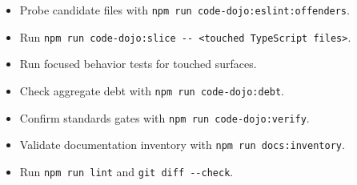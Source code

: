 \begin{itemize}
\tightlist
\item
  Probe candidate files with \texttt{n\allowbreak{}p\allowbreak{}m\allowbreak{} \allowbreak{}r\allowbreak{}u\allowbreak{}n\allowbreak{} \allowbreak{}c\allowbreak{}o\allowbreak{}d\allowbreak{}e\allowbreak{}-\allowbreak{}d\allowbreak{}o\allowbreak{}j\allowbreak{}o\allowbreak{}:\allowbreak{}e\allowbreak{}s\allowbreak{}l\allowbreak{}i\allowbreak{}n\allowbreak{}t\allowbreak{}:\allowbreak{}o\allowbreak{}f\allowbreak{}f\allowbreak{}e\allowbreak{}n\allowbreak{}d\allowbreak{}e\allowbreak{}r\allowbreak{}s}.
\item
  Run \texttt{n\allowbreak{}p\allowbreak{}m\allowbreak{} \allowbreak{}r\allowbreak{}u\allowbreak{}n\allowbreak{} \allowbreak{}c\allowbreak{}o\allowbreak{}d\allowbreak{}e\allowbreak{}-\allowbreak{}d\allowbreak{}o\allowbreak{}j\allowbreak{}o\allowbreak{}:\allowbreak{}s\allowbreak{}l\allowbreak{}i\allowbreak{}c\allowbreak{}e\allowbreak{} \allowbreak{}-\allowbreak{}-\allowbreak{} \allowbreak{}<\allowbreak{}t\allowbreak{}o\allowbreak{}u\allowbreak{}c\allowbreak{}h\allowbreak{}e\allowbreak{}d\allowbreak{} \allowbreak{}T\allowbreak{}y\allowbreak{}p\allowbreak{}e\allowbreak{}S\allowbreak{}c\allowbreak{}r\allowbreak{}i\allowbreak{}p\allowbreak{}t\allowbreak{} \allowbreak{}f\allowbreak{}i\allowbreak{}l\allowbreak{}e\allowbreak{}s\allowbreak{}>}.
\item
  Run focused behavior tests for touched surfaces.
\item
  Check aggregate debt with \texttt{n\allowbreak{}p\allowbreak{}m\allowbreak{} \allowbreak{}r\allowbreak{}u\allowbreak{}n\allowbreak{} \allowbreak{}c\allowbreak{}o\allowbreak{}d\allowbreak{}e\allowbreak{}-\allowbreak{}d\allowbreak{}o\allowbreak{}j\allowbreak{}o\allowbreak{}:\allowbreak{}d\allowbreak{}e\allowbreak{}b\allowbreak{}t}.
\item
  Confirm standards gates with \texttt{n\allowbreak{}p\allowbreak{}m\allowbreak{} \allowbreak{}r\allowbreak{}u\allowbreak{}n\allowbreak{} \allowbreak{}c\allowbreak{}o\allowbreak{}d\allowbreak{}e\allowbreak{}-\allowbreak{}d\allowbreak{}o\allowbreak{}j\allowbreak{}o\allowbreak{}:\allowbreak{}v\allowbreak{}e\allowbreak{}r\allowbreak{}i\allowbreak{}f\allowbreak{}y}.
\item
  Validate documentation inventory with \texttt{n\allowbreak{}p\allowbreak{}m\allowbreak{} \allowbreak{}r\allowbreak{}u\allowbreak{}n\allowbreak{} \allowbreak{}d\allowbreak{}o\allowbreak{}c\allowbreak{}s\allowbreak{}:\allowbreak{}i\allowbreak{}n\allowbreak{}v\allowbreak{}e\allowbreak{}n\allowbreak{}t\allowbreak{}o\allowbreak{}r\allowbreak{}y}.
\item
  Run \texttt{n\allowbreak{}p\allowbreak{}m\allowbreak{} \allowbreak{}r\allowbreak{}u\allowbreak{}n\allowbreak{} \allowbreak{}l\allowbreak{}i\allowbreak{}n\allowbreak{}t} and \texttt{g\allowbreak{}i\allowbreak{}t\allowbreak{} \allowbreak{}d\allowbreak{}i\allowbreak{}f\allowbreak{}f\allowbreak{} \allowbreak{}-\allowbreak{}-\allowbreak{}c\allowbreak{}h\allowbreak{}e\allowbreak{}c\allowbreak{}k}.
\end{itemize}

